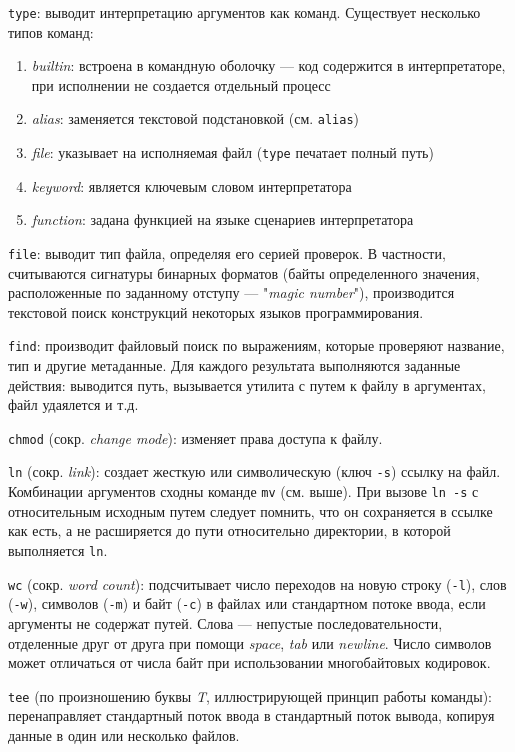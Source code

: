 \documentclass[listings]{labreport}
\begin{document}
\texttt{type}: выводит интерпретацию аргументов как команд. Существует несколько типов команд:

\begin{enumerate}
\item \textit{builtin}: встроена в командную оболочку — код содержится в интерпретаторе, при исполнении не создается отдельный процесс
\item \textit{alias}: заменяется текстовой подстановкой (см. \texttt{alias})
\item \textit{file}: указывает на исполняемая файл (\texttt{type} печатает полный путь)
\item \textit{keyword}: является ключевым словом интерпретатора
\item \textit{function}: задана функцией на языке сценариев интерпретатора
\end{enumerate}

\texttt{file}: выводит тип файла, определяя его серией проверок. В частности, считываются сигнатуры бинарных форматов
(байты определенного значения, расположенные по заданному отступу — "\textit{magic number}"),
производится текстовой поиск конструкций некоторых языков программирования.

\texttt{find}: производит файловый поиск по выражениям, которые проверяют название, тип и другие метаданные.
Для каждого результата выполняются заданные действия: выводится путь, вызывается утилита с путем к файлу в аргументах, файл удаялется и т.д.

\texttt{chmod} (сокр. \textit{change mode}): изменяет права доступа к файлу.

\texttt{ln} (сокр. \textit{link}): создает жесткую или символическую (ключ \texttt{-s}) ссылку на файл.
Комбинации аргументов сходны команде \texttt{mv} (см. выше). При вызове \texttt{ln -s} с относительным исходным
путем следует помнить, что он сохраняется в ссылке как есть, а не расширяется до пути относительно директории,
в которой выполняется \texttt{ln}.

\texttt{wc} (сокр. \textit{word count}): подсчитывает число переходов на новую строку (\texttt{-l}),
слов (\texttt{-w}), символов (\texttt{-m}) и байт (\texttt{-c}) в файлах или стандартном потоке ввода,
если аргументы не содержат путей. Слова — непустые последовательности,
отделенные друг от друга при помощи \textit{space}, \textit{tab} или \textit{newline}. Число символов
может отличаться от числа байт при использовании многобайтовых кодировок.

\texttt{tee} (по произношению буквы \textit{T}, иллюстрирующей принцип работы команды): перенаправляет
стандартный поток ввода в стандартный поток вывода, копируя данные в один или несколько файлов.
\end{document}
